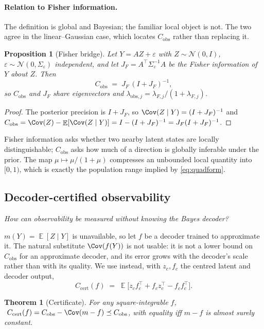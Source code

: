 \documentclass{article}
\newtheorem{proposition}{Proposition}
\newtheorem{theorem}{Theorem}
\theoremstyle{definition}
\DeclareMathOperator{\Exp}{\mathbb{E}}
\newcommand{\Cobs}{C_{\mathrm{obs}}}
\newcommand{\Ccert}{C_{\mathrm{cert}}}
\begin{document}
\paragraph{Relation to Fisher information.}
The definition is global and Bayesian; the familiar local object is not. The two agree in
the linear--Gaussian case, which locates $\Cobs$ rather than replacing it.

\begin{proposition}[Fisher bridge]
\label{prop:fisher}
Let $Y=AZ+\varepsilon$ with $Z\sim\mathcal N(0,I)$, $\varepsilon\sim\mathcal N(0,\Sigma_
\varepsilon)$ independent, and let $J_F=A^\top\Sigma_\varepsilon^{-1}A$ be the Fisher
information of $Y$ about $Z$. Then
\[
  \Cobs \;=\; J_F\,(I+J_F)^{-1},
\]
so $\Cobs$ and $J_F$ share eigenvectors and $\lambda_{\mathrm{obs},j}=\lambda_{F,j}/(1+
\lambda_{F,j})$.
\end{proposition}
\begin{proof}
The posterior precision is $I+J_F$, so $\Cov(Z\mid Y)=(I+J_F)^{-1}$ and
$\Cobs=\Cov(Z)-\Exp[\Cov(Z\mid Y)]=I-(I+J_F)^{-1}=J_F(I+J_F)^{-1}$.
\end{proof}

Fisher information asks whether two nearby latent states are locally distinguishable;
$\Cobs$ asks how much of a direction is globally inferable under the prior. The map
$\mu\mapsto\mu/(1+\mu)$ compresses an unbounded local quantity into $[0,1)$, which is
exactly the population range implied by \eqref{eq:quadform}.

\subsection{Decoder-certified observability}
\label{sec:certificate}

\emph{How can observability be measured without knowing the Bayes decoder?}

$m(Y)=\Exp[Z\mid Y]$ is unavailable, so let $f$ be a decoder trained to approximate it.
The natural substitute $\Cov(f(Y))$ is not usable: it is not a lower bound on $\Cobs$ for
an approximate decoder, and its error grows with the decoder's scale rather than with its
quality. We use instead, with $z_c,f_c$ the centred latent and decoder output,
\begin{equation}
  \Ccert(f)\;=\;\Exp\bigl[z_cf_c^\top+f_cz_c^\top-f_cf_c^\top\bigr].
  \label{eq:ccert}
\end{equation}

\begin{theorem}[Certificate]
\label{thm:cert}
For any square-integrable $f$, $\ \Ccert(f)=\Cobs-\Cov(m-f)\preceq\Cobs$, with equality
iff $m-f$ is almost surely constant.
\end{theorem}
\end{document}
